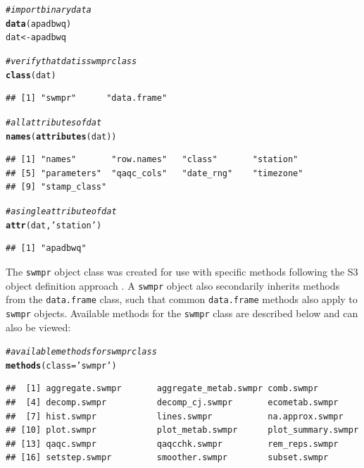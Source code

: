 \documentclass[10pt,letterpaper]{article}\usepackage[]{graphicx}\usepackage[]{color}
\makeatletter
\newcommand{\hlstr}[1]{\textcolor[rgb]{0.192,0.494,0.8}{#1}}%
\newcommand{\hlcom}[1]{\textcolor[rgb]{0.678,0.584,0.686}{\textit{#1}}}%
\newcommand{\hlstd}[1]{\textcolor[rgb]{0.345,0.345,0.345}{#1}}%
\newcommand{\hlkwb}[1]{\textcolor[rgb]{0.69,0.353,0.396}{#1}}%
\newcommand{\hlkwc}[1]{\textcolor[rgb]{0.333,0.667,0.333}{#1}}%
\newcommand{\hlkwd}[1]{\textcolor[rgb]{0.737,0.353,0.396}{\textbf{#1}}}%
\newenvironment{kframe}{%
 \def\at@end@of@kframe{}%
 \ifinner\ifhmode%
  \def\at@end@of@kframe{\end{minipage}}%
  \begin{minipage}{\columnwidth}%
 \fi\fi%
 \def\FrameCommand##1{\hskip\@totalleftmargin \hskip-\fboxsep
 \colorbox{shadecolor}{##1}\hskip-\fboxsep
     \hskip-\linewidth \hskip-\@totalleftmargin \hskip\columnwidth}%
 \MakeFramed {\advance\hsize-\width
   \@totalleftmargin\z@ \linewidth\hsize
   \@setminipage}}%
 {\par\unskip\endMakeFramed%
 \at@end@of@kframe}
\newenvironment{knitrout}{}{} %
\makeatother
\begin{document}
\begin{knitrout}
\color{fgcolor}\begin{kframe}
\begin{alltt}
\hlcom{# import binary data}
\hlkwd{data}\hlstd{(apadbwq)}
\hlstd{dat} \hlkwb{<-} \hlstd{apadbwq}

\hlcom{# verify that dat is swmpr class}
\hlkwd{class}\hlstd{(dat)}
\end{alltt}
\begin{verbatim}
## [1] "swmpr"      "data.frame"
\end{verbatim}
\begin{alltt}
\hlcom{# all attributes of dat}
\hlkwd{names}\hlstd{(}\hlkwd{attributes}\hlstd{(dat))}
\end{alltt}
\begin{verbatim}
## [1] "names"       "row.names"   "class"       "station"    
## [5] "parameters"  "qaqc_cols"   "date_rng"    "timezone"   
## [9] "stamp_class"
\end{verbatim}
\begin{alltt}
\hlcom{# a single attribute of dat}
\hlkwd{attr}\hlstd{(dat,} \hlstr{'station'}\hlstd{)}
\end{alltt}
\begin{verbatim}
## [1] "apadbwq"
\end{verbatim}
\end{kframe}
\end{knitrout}
 
The \texttt{swmpr} object class was created for use with specific methods following the S3 object definition approach \cite{Wickham14}.  A \texttt{swmpr} object also secondarily inherits methods from the \texttt{data.frame} class, such that common \texttt{data.frame} methods also apply to \texttt{swmpr} objects.  Available methods for the \texttt{swmpr} class are described below and can also be viewed:
 
\begin{knitrout}
\color{fgcolor}\begin{kframe}
\begin{alltt}
\hlcom{# available methods for swmpr class}
\hlkwd{methods}\hlstd{(}\hlkwc{class} \hlstd{=} \hlstr{'swmpr'}\hlstd{)}
\end{alltt}
\begin{verbatim}
##  [1] aggregate.swmpr       aggregate_metab.swmpr comb.swmpr           
##  [4] decomp.swmpr          decomp_cj.swmpr       ecometab.swmpr       
##  [7] hist.swmpr            lines.swmpr           na.approx.swmpr      
## [10] plot.swmpr            plot_metab.swmpr      plot_summary.swmpr   
## [13] qaqc.swmpr            qaqcchk.swmpr         rem_reps.swmpr       
## [16] setstep.swmpr         smoother.swmpr        subset.swmpr
\end{verbatim}
\end{kframe}
\end{knitrout}
\end{document}
